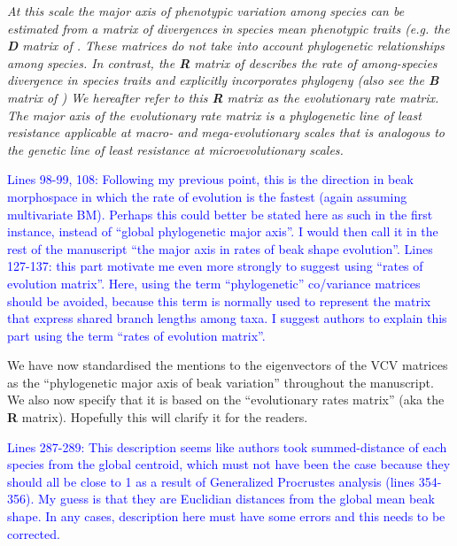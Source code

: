 \documentclass[12pt,letterpaper]{article}
\begin{document}
{\noindent\textit{At this scale the major axis of phenotypic variation among species \cite{marroig2005size, fasanelli2022allometry} can be estimated from a matrix of divergences in species mean phenotypic traits (e.g. the \textbf{D} matrix of \cite{BlowsHiggie2003, mcglothlin2018adaptive}.
These matrices do not take into account phylogenetic relationships among species.
In contrast, the \textbf{R} matrix of \cite{Houle2017} describes the rate of among-species divergence in species traits and explicitly incorporates phylogeny (also see the \textbf{B} matrix of \cite{Machado2020}) %
We hereafter refer to this \textbf{R} matrix as the \textit{evolutionary rate matrix}. %
The major axis of the evolutionary rate matrix is a phylogenetic line of least resistance applicable at macro- and mega-evolutionary scales that is analogous to the genetic line of least resistance at microevolutionary scales.
}

\textcolor{blue}{Lines 98-99, 108: Following my previous point, this is the direction in beak morphospace in which the rate of evolution is the fastest (again assuming multivariate BM). Perhaps this could better be stated here as such in the first instance, instead of “global phylogenetic major axis”. I would then call it in the rest of the manuscript “the major axis in rates of beak shape evolution”.
Lines 127-137: this part motivate me even more strongly to suggest using “rates of evolution matrix”. Here, using the term “phylogenetic” co/variance matrices should be avoided, because this term is normally used to represent the matrix that express shared branch lengths among taxa. I suggest authors to explain this part using the term “rates of evolution matrix”.}

We have now standardised the mentions to the eigenvectors of the VCV matrices as the “phylogenetic major axis of beak variation” throughout the manuscript. We also now specify that it is based on the “evolutionary rates matrix” (aka the \textbf{R} matrix). Hopefully this will clarify it for the readers.

\textcolor{blue}{Lines 287-289: This description seems like authors took summed-distance of each species from the global centroid, which must not have been the case because they should all be close to 1 as a result of Generalized Procrustes analysis (lines 354-356). My guess is that they are Euclidian distances from the global mean beak shape. In any cases, description here must have some errors and this needs to be corrected.}

}
\end{document}
